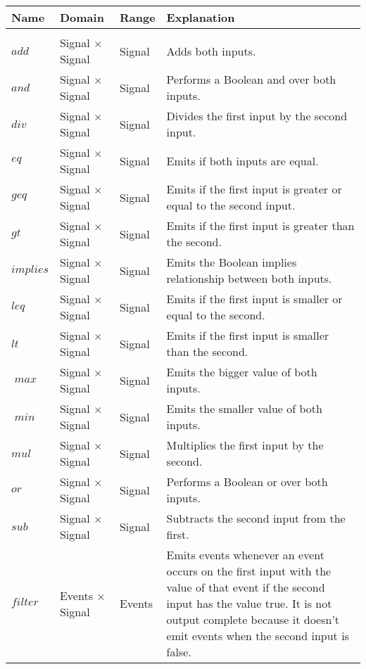 \begin{longtable}{lp{3cm}lp{6cm}}
  Name                 & Domain                    & Range   & Explanation \\
  \toprule \\
  \endhead{}
  \(\mathit{add}\)              & Signal \(\times\) Signal  & Signal  & Adds both inputs. \\
  \(\mathit{and}\)              & Signal \(\times\) Signal  & Signal  & Performs a Boolean and over both inputs. \\
  \(\mathit{div}\)              & Signal \(\times\) Signal  & Signal  & Divides the first input by the second input. \\
  \(\mathit{eq}\)               & Signal \(\times\) Signal  & Signal  & Emits if both inputs are equal. \\
  \(\mathit{geq}\)              & Signal \(\times\) Signal  & Signal  & Emits if the first input is greater or equal to the second input. \\
  \(\mathit{gt}\)               & Signal \(\times\) Signal  & Signal  & Emits if the first input is greater than the second.\\
  \(\mathit{implies}\)          & Signal \(\times\) Signal  & Signal  & Emits the Boolean implies relationship between both inputs.\\
  \(\mathit{leq}\)              & Signal \(\times\) Signal  & Signal  & Emits if the first input is smaller or equal to the second.\\
  \(\mathit{lt}\)               & Signal \(\times\) Signal  & Signal  & Emits if the first input is smaller than the second.\\
  \(\mathit{\max}\)              & Signal \(\times\) Signal  & Signal  & Emits the bigger value of both inputs. \\
  \(\mathit{\min}\)              & Signal \(\times\) Signal  & Signal  & Emits the smaller value of both inputs.\\
  \(\mathit{mul}\)              & Signal \(\times\) Signal  & Signal  & Multiplies the first input by the second.\\
  \(\mathit{or}\)               & Signal \(\times\) Signal  & Signal  & Performs a Boolean or over both inputs.\\
  \(\mathit{sub}\)              & Signal \(\times\) Signal  & Signal  & Subtracts the second input from the first.\\
  \(\mathit{filter}\)           & Events \(\times\) Signal  & Events  & Emits events whenever an event occurs on the first input with the value of that event if the second input has the value true. It is not output complete because it doesn't emit events when the second input is false. \\

\end{longtable}
